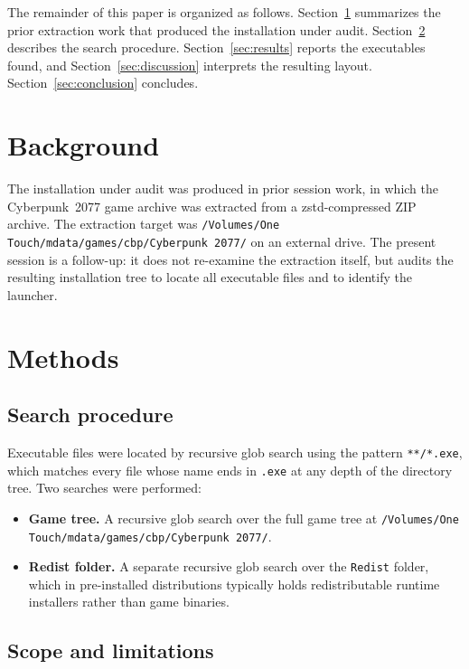 \documentclass[11pt]{article}
\begin{document}
The remainder of this paper is organized as follows.
Section~\ref{sec:background} summarizes the prior extraction work that produced
the installation under audit. Section~\ref{sec:methods} describes the search
procedure. Section~\ref{sec:results} reports the executables found, and
Section~\ref{sec:discussion} interprets the resulting layout.
Section~\ref{sec:conclusion} concludes.

\section{Background}
\label{sec:background}

The installation under audit was produced in prior session work, in which the
Cyberpunk~2077 game archive was extracted from a zstd-compressed ZIP archive.
The extraction target was
\texttt{/Volumes/One Touch/mdata/games/cbp/Cyberpunk 2077/} on an external
drive. The present session is a follow-up: it does not re-examine the
extraction itself, but audits the resulting installation tree to locate all
executable files and to identify the launcher.

\section{Methods}
\label{sec:methods}

\subsection{Search procedure}
\label{sec:procedure}

Executable files were located by recursive glob search using the pattern
\texttt{**/*.exe}, which matches every file whose name ends in
\texttt{.exe} at any depth of the directory tree. Two searches were performed:

\begin{itemize}
  \item \textbf{Game tree.} A recursive glob search over the full game tree at
        \texttt{/Volumes/One Touch/mdata/games/cbp/Cyberpunk 2077/}.
  \item \textbf{Redist folder.} A separate recursive glob search over the
        \texttt{Redist} folder, which in pre-installed distributions typically
        holds redistributable runtime installers rather than game binaries.
\end{itemize}

\subsection{Scope and limitations}
\label{sec:scope}
\end{document}
